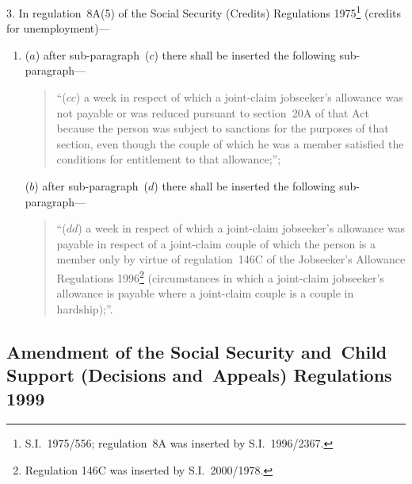 \documentclass[12pt,a4paper]{article}
\begin{document}
3.  In regulation~8A(5) of the Social Security (Credits) Regulations 1975\footnote{S.I.~1975/556; regulation~8A was inserted by S.I.~1996/2367.} (credits for unemployment)—
\begin{enumerate}\item[]
($a$) after sub-paragraph~($c$)  there shall be inserted the following sub-paragraph—
\begin{quotation}
“($cc$) a week in respect of which a joint-claim jobseeker’s allowance was not payable or was reduced pursuant to section~20A of that Act because the person was subject to sanctions for the purposes of that section, even though the couple of which he was a member satisfied the conditions for entitlement to that allowance;”;
\end{quotation}

($b$) after sub-paragraph~($d$)  there shall be inserted the following sub-paragraph—
\begin{quotation}
“($dd$) a week in respect of which a joint-claim jobseeker’s allowance was payable in respect of a joint-claim couple of which the person is a member only by virtue of regulation~146C of the Jobseeker’s Allowance Regulations 1996\footnote{Regulation 146C was inserted by S.I.~2000/1978.} (circumstances in which a joint-claim jobseeker’s allowance is payable where a joint-claim couple is a couple in hardship);”.
\end{quotation}
\end{enumerate}

\subsection[4. Amendment of the Social Security and~Child Support (Decisions and~Appeals) Regulations 1999]{Amendment of the Social Security and~Child Support (Decisions and~Appeals) Regulations 1999}
\end{document}
